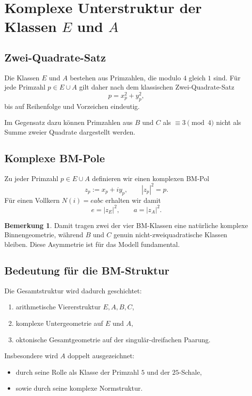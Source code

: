 \documentclass[11pt,a4paper]{article}
\theoremstyle{definition}
\newtheorem{bemerkung}[definition]{Bemerkung}
\theoremstyle{plain}
\begin{document}
	\section{Komplexe Unterstruktur der Klassen $E$ und $A$}
	
	\subsection{Zwei-Quadrate-Satz}
	
	Die Klassen $E$ und $A$ bestehen aus Primzahlen, die modulo $4$ gleich $1$ sind. Für jede Primzahl $p\in E\cup A$ gilt daher nach dem klassischen Zwei-Quadrate-Satz
	\[
	p=x_p^2+y_p^2,
	\]
	bis auf Reihenfolge und Vorzeichen eindeutig.
	
	Im Gegensatz dazu können Primzahlen aus $B$ und $C$ als $\equiv 3\pmod 4$ nicht als Summe zweier Quadrate dargestellt werden.
	
	\subsection{Komplexe BM-Pole}
	
	Zu jeder Primzahl $p\in E\cup A$ definieren wir einen komplexen BM-Pol
	\[
	z_p := x_p + i y_p,
	\qquad |z_p|^2 = p.
	\]
	Für einen Vollkern $N(i)=eabc$ erhalten wir damit
	\[
	e = |z_E|^2,
	\qquad
	a = |z_A|^2.
	\]
	
	\begin{bemerkung}
		Damit tragen zwei der vier BM-Klassen eine natürliche komplexe Binnengeometrie, während $B$ und $C$ genuin nicht-zweiquadratische Klassen bleiben. Diese Asymmetrie ist für das Modell fundamental.
	\end{bemerkung}
	
	\subsection{Bedeutung für die BM-Struktur}
	
	Die Gesamtstruktur wird dadurch geschichtet:
	\begin{enumerate}[leftmargin=2em]
		\item arithmetische Viererstruktur $E,A,B,C$,
		\item komplexe Untergeometrie auf $E$ und $A$,
		\item oktonische Gesamtgeometrie auf der singulär-dreifachen Paarung.
	\end{enumerate}
	
	Insbesondere wird $A$ doppelt ausgezeichnet:
	\begin{itemize}[leftmargin=2em]
		\item durch seine Rolle als Klasse der Primzahl $5$ und der $25$-Schale,
		\item sowie durch seine komplexe Normstruktur.
	\end{itemize}
	
\end{document}
